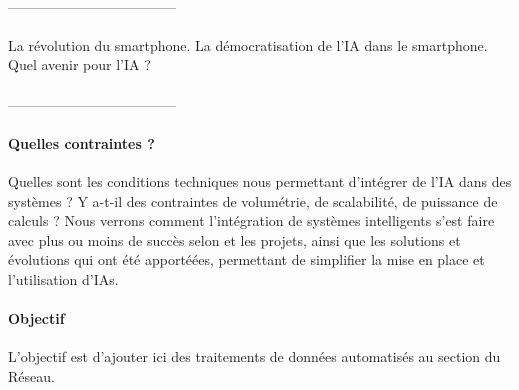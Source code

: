 \paragraph{} ------------------------------------

\paragraph{} La révolution du smartphone. La démocratisation de l'IA dans le smartphone.
Quel avenir pour l'IA ?

\paragraph{} ------------------------------------

\paragraph{Quelles contraintes ?} Quelles sont les conditions techniques nous
permettant d'intégrer de l'IA dans des systèmes ? Y a-t-il des contraintes de
volumétrie, de scalabilité, de puissance de calculs ? Nous verrons comment
l'intégration de systèmes intelligents s'est faire avec plus ou moins de succès
selon et les projets, ainsi que les solutions et évolutions qui ont été apportéées,
permettant de simplifier la mise en place et l'utilisation d'IAs.

\paragraph{Objectif} L'objectif est d'ajouter ici des traitements de données automatisés au section
du Réseau.


